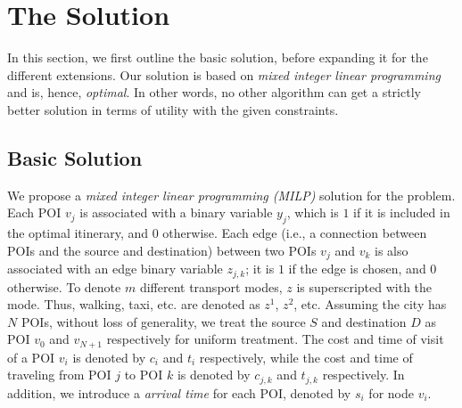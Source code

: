 \section{The \trip Solution}
\label{sec:ilp}

In this section, we first outline the basic solution, before expanding it for
the different extensions.
Our solution is based on \emph{mixed integer linear programming} and is, hence,
\emph{optimal}.
In other words, no other algorithm can get a strictly better solution in terms
of utility with the given constraints.

\subsection{Basic Solution}
\label{sec:basic}

We propose a \emph{mixed integer linear programming (MILP)} solution for
the \trip problem.  Each POI $v_{j}$ is associated with a binary
variable $y_{j}$, which is $1$ if it is included in the optimal
itinerary, and $0$ otherwise.  Each edge (i.e., a connection between
POIs and the source and destination) between two POIs $v_{j}$ and
$v_{k}$ is also associated with an edge binary variable $z_{j,k}$; it is
$1$ if the edge is chosen, and $0$ otherwise.  To denote $m$ different
transport modes, $z$ is superscripted with the mode.  Thus, walking,
taxi, etc. are denoted as $z^1$, $z^2$, etc.  Assuming the city has $N$
POIs, without loss of generality, we treat the source $S$ and
destination $D$ as POI $v_{0}$ and $v_{{N+1}}$ respectively for uniform
treatment.  The cost and time of visit of a POI $v_i$ is denoted by
$c_i$ and $t_i$ respectively, while the cost and time of traveling from
POI $j$ to POI $k$ is denoted by $c_{j,k}$ and $t_{j,k}$ respectively.
In addition, 
we introduce a \emph{arrival time} for each POI, denoted by $s_i$ for node $v_i$.

